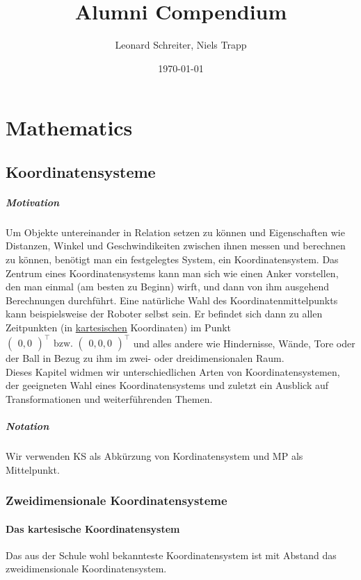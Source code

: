 \documentclass[12pt,a4paper]{report}
\title{Alumni Compendium}           %
\author{Leonard Schreiter, Niels Trapp}          %
\date{\today}           %
\begin{document}
    \maketitle

    \tableofcontents

    \chapter{Mathematics}
        \section{Koordinatensysteme}
        \paragraph{Motivation}

        Um Objekte untereinander in Relation setzen zu können und Eigenschaften wie Distanzen, Winkel und Geschwindikeiten zwischen ihnen messen und berechnen zu können, benötigt man ein festgelegtes System, ein Koordinatensystem.
        Das Zentrum eines Koordinatensystems kann man sich wie einen Anker vorstellen, den man einmal (am besten zu Beginn) wirft, und dann von ihm ausgehend Berechnungen durchführt.
        Eine natürliche Wahl des Koordinatenmittelpunkts kann beispielsweise der Roboter selbst sein. Er befindet sich dann zu allen Zeitpunkten (in \hyperref[Mathe_KS_kartesisch]{kartesischen} Koordinaten) im Punkt 
        $\begin{pmatrix}0,0\end{pmatrix}^\top \text{ bzw. } \begin{pmatrix}0,0,0\end{pmatrix}^\top$ und alles andere wie Hindernisse, Wände, Tore oder der Ball in Bezug zu ihm im zwei- oder dreidimensionalen Raum. \\
        Dieses Kapitel widmen wir unterschiedlichen Arten von Koordinatensystemen, der geeigneten Wahl eines Koordinatensystems und zuletzt ein Ausblick auf Transformationen und weiterführenden Themen.
        
        \paragraph{Notation}
        Wir verwenden KS als Abkürzung von Kordinatensystem und MP als Mittelpunkt.

        \subsection{Zweidimensionale Koordinatensysteme}
        \label{Mathe_KS_kartesisch}\subsubsection{Das kartesische Koordinatensystem}
        Das aus der Schule wohl bekannteste Koordinatensystem ist mit Abstand das zweidimensionale Koordinatensystem. 

    
        
\end{document}
